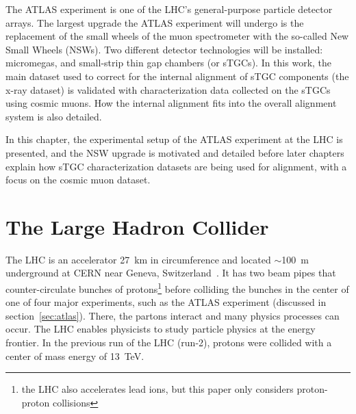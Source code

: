 The ATLAS experiment is one of the LHC's general-purpose particle detector arrays. The largest upgrade the ATLAS experiment will undergo is the replacement of the small wheels of the muon spectrometer with the so-called New Small Wheels (NSWs). Two different detector technologies will be installed: micromegas, and small-strip thin gap chambers (or sTGCs). In this work, the main dataset used to correct for the internal alignment of sTGC components (the x-ray dataset) is validated with characterization data collected on the sTGCs using cosmic muons. How the internal alignment fits into the overall alignment system is also detailed. 

In this chapter, the experimental setup of the ATLAS experiment at the LHC is presented, and the NSW upgrade is motivated and detailed before later chapters explain how sTGC characterization datasets are being used for alignment, with a focus on the cosmic muon dataset.

\section{The Large Hadron Collider}

The LHC is an accelerator \SI{27}{\kilo\meter} in circumference and located $\sim$\SI{100}{\meter} underground at CERN near Geneva, Switzerland~\cite{evans_lhc_2008}. It has two beam pipes that counter-circulate bunches of protons\footnote{the LHC also accelerates lead ions, but this paper only considers proton-proton collisions} before colliding the bunches in the center of one of four major experiments, such as the ATLAS experiment (discussed in section~\ref{sec:atlas}). There, the partons interact and many physics processes can occur. The LHC enables physicists to study particle physics at the energy frontier. In the previous run of the LHC (run-2), protons were collided with a center of mass energy of \SI{13}{\tera\electronvolt}. 



